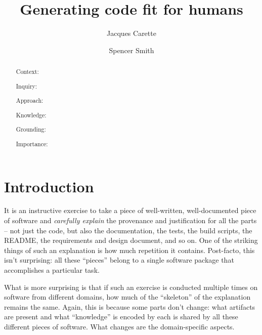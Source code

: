\documentclass[english,submission]{programming}
\begin{document}
\title{Generating code fit for humans} %

\author[a]{Jacques Carette}
\author[a]{Spencer Smith}



\maketitle

\begin{abstract}
  Context:

  Inquiry:

  Approach:

  Knowledge:

  Grounding:

  Importance:

\end{abstract}

\section{Introduction}
\label{sec:intro}

It is an instructive exercise to take a piece of well-written, well-documented
piece of software and \emph{carefully explain} the provenance and justification
for all the parts -- not just the code, but also the documentation, the tests, the
build scripts, the README, the requirements and design document, and so on.
One of the striking things of such an explanation is how much repetition it contains.
Post-facto, this isn't surprising: all these ``pieces'' belong to a single software
package that accomplishes a particular task.

What is more surprising is that if such an exercise is conducted multiple times
on software from different domains, how much of the ``skeleton'' of the explanation
remains the same. Again, this is because some parts don't change: what artifacts
are present and what ``knowledge'' is encoded by each is shared by all these different
pieces of software. What changes are the domain-specific aspects.
\end{document}
